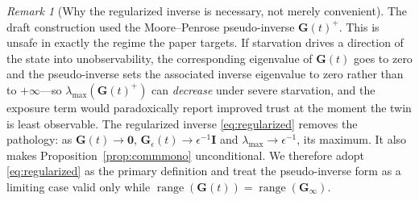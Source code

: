 \documentclass[journal]{IEEEtran}
\theoremstyle{plain}
\theoremstyle{definition}
\theoremstyle{remark}
\newtheorem{remark}{Remark}
\newcommand{\bG}{\mathbf{G}}
\newcommand{\bI}{\mathbf{I}}
\newcommand{\lmax}{\lambda_{\max}}
\begin{document}
\begin{remark}[Why the regularized inverse is necessary, not merely convenient]
\label{rem:pinv}
The draft construction used the Moore--Penrose pseudo-inverse
$\bG(t)^{+}$. This is unsafe in exactly the regime the paper targets. If
starvation drives a direction of the state into unobservability, the
corresponding eigenvalue of $\bG(t)$ goes to zero and the pseudo-inverse
sets the associated inverse eigenvalue to zero rather than to
$+\infty$---so $\lmax(\bG(t)^{+})$ can \emph{decrease} under severe
starvation, and the exposure term would paradoxically report improved
trust at the moment the twin is least observable. The regularized inverse
\eqref{eq:regularized} removes the pathology: as $\bG(t)\to\mathbf{0}$,
$\bG_{\epsilon}(t)\to\epsilon^{-1}\bI$ and $\lmax\to\epsilon^{-1}$, its
maximum. It also makes Proposition~\ref{prop:commmono} unconditional. We
therefore adopt \eqref{eq:regularized} as the primary definition and treat
the pseudo-inverse form as a limiting case valid only while
$\operatorname{range}(\bG(t))=\operatorname{range}(\bG_{\infty})$.
\end{remark}
\end{document}
